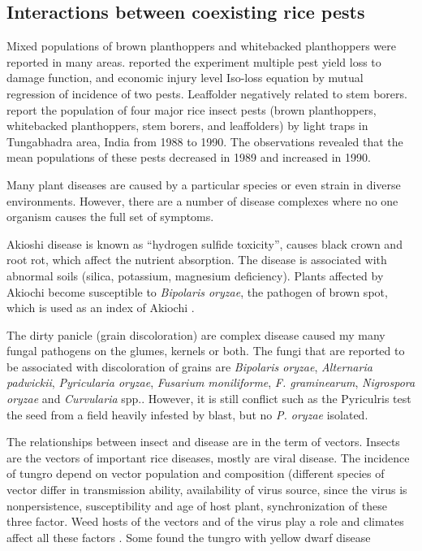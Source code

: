 \subsection*{Interactions between coexisting rice pests}

Mixed populations of brown planthoppers and whitebacked planthoppers were reported in many areas. \cite{Naganagoud_2010_Studies} reported the experiment multiple pest yield loss to damage function, and economic injury level Iso-loss equation by mutual regression of incidence of two pests. Leaffolder negatively related to stem borers. \cite{Selvaraj_2012_Determination} report the population of four major rice insect pests (brown planthoppers, whitebacked planthoppers, stem borers, and leaffolders) by light traps in Tungabhadra area, India from 1988 to 1990. The observations revealed that the mean populations of these pests decreased in 1989 and increased in 1990.

Many plant diseases are caused by a particular species or even strain in diverse environments. However, there are a number of disease complexes where no one organism causes the full set of symptoms.

Akioshi disease is known as ``hydrogen sulfide toxicity'', causes black crown and root rot, which affect the nutrient absorption. The disease is associated with abnormal soils (silica, potassium, magnesium deficiency). Plants affected by Akiochi become susceptible to \textit{Bipolaris oryzae}, the pathogen of brown spot, which is used as an index of Akiochi \citep{Ou_1985_Rice}.

The dirty panicle (grain discoloration) are complex disease caused my many fungal pathogens on the glumes, kernels or both. The fungi that are reported to be associated with discoloration of grains are \textit{Bipolaris oryzae}, \textit{Alternaria padwickii}, \textit{Pyricularia oryzae}, \textit{Fusarium moniliforme}, \textit{F. graminearum}, \textit{Nigrospora oryzae} and \textit{Curvularia} spp.\cite{Ou_1985_Rice}. However, it is still conflict such as the Pyriculris test the seed from a field heavily infested by blast, but no \textit{P. oryzae} isolated.

The relationships between insect and disease are in the term of vectors. Insects are the vectors of important rice diseases, mostly are viral disease. The incidence of tungro depend on vector population and composition (different species of vector differ in transmission ability, availability of virus source, since the virus is nonpersistence, susceptibility and age of host plant, synchronization of these three factor. Weed hosts of the vectors and of the virus play a role and climates affect all these factors \cite{Naganagoud_2010_Studies}. Some found the tungro with yellow dwarf disease \cite{Ou_1985_Rice}


